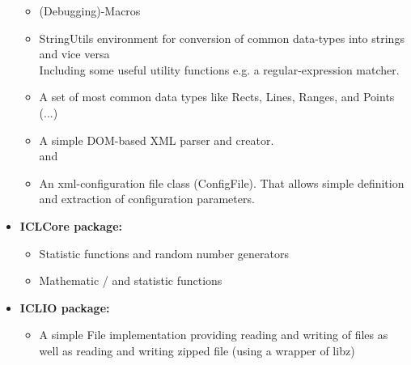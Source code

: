 \begin{itemize}
\begin{itemize}
        \item (Debugging)-Macros \\

        \item StringUtils environment for conversion of common data-types into strings and vice versa \\
        Including some useful utility functions e.g. a regular-expression matcher.

        \item A set of most common data types like Rects, Lines, Ranges, and Points \\
            
            (...)

          \item A simple DOM-based XML parser and creator.\\
           and 

        \item An xml-configuration file class (ConfigFile). That allows simple definition and extraction of configuration parameters.\\

\end{itemize}

\item \textbf{ICLCore package:} \\
\begin{itemize}

        \item Statistic functions and random number generators\\

        \item Mathematic / and statistic functions\\

\end{itemize}

\item \textbf{ICLIO package:} \\
\begin{itemize}
        \item A simple File implementation providing reading and writing of files as well as reading and writing zipped file (using a wrapper of libz)\\
        

\end{itemize}
\end{itemize}
